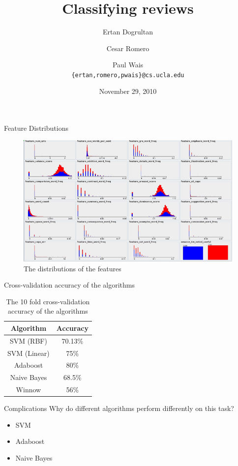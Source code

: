\documentclass{beamer}
\title{Classifying reviews}
\author{Ertan Dogrultan \and Cesar Romero \and Paul Wais\\
\texttt{\{ertan,romero,pwais\}@cs.ucla.edu}}
\date{November 29, 2010}
\begin{document}
\maketitle{}

\begin{frame}{Feature Distributions}
\begin{figure}[h]
  \centering
  \includegraphics[scale=.4]{features_distributions}
  \caption{The distributions of the features}
  \label{fig:dist}
\end{figure}
\end{frame}

\begin{frame}{Cross-validation accuracy of the algorithms}
\begin{table}[ht]
  \centering
  \begin{tabular}{c | c}
    Algorithm    & Accuracy \\
    \hline
    SVM (RBF)    & 70.13\%  \\
    SVM (Linear) & 75\%     \\
    Adaboost     & 80\%     \\
    Naive Bayes  & 68.5\%   \\
    Winnow       & 56\%     \\
  \end{tabular}
  \caption{The 10 fold cross-validation accuracy of the algorithms}
  \label{tab:performance}
\end{table}
\end{frame}

\begin{frame}{Complications}
Why do different algorithms perform differently on this task?
\begin{itemize}
\item SVM
\item Adaboost
\item Naive Bayes 
\end{itemize}
\end{frame}
\end{document}
